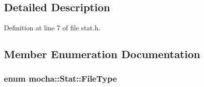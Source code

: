 \subsection{Detailed Description}


Definition at line 7 of file stat.h.



\subsection{Member Enumeration Documentation}
\hypertarget{classmocha_1_1_stat_a5d24a871c13f068a042e605f575c6a0a}{
\subsubsection[{FileType}]{\setlength{\rightskip}{0pt plus 5cm}enum {\bf mocha::Stat::FileType}}}
\label{classmocha_1_1_stat_a5d24a871c13f068a042e605f575c6a0a}
